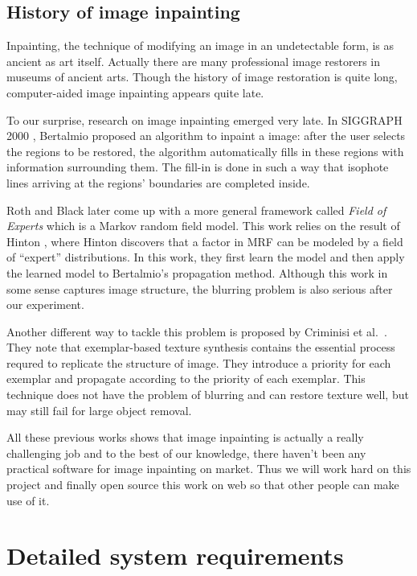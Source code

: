 \subsection{History of image inpainting}
Inpainting, the technique of modifying an image in an undetectable form, is as ancient as art itself. Actually there are many professional image restorers in museums of ancient arts. Though the history of image restoration is quite long, computer-aided image inpainting appears quite late.

To our surprise, research on image inpainting emerged very late. In SIGGRAPH 2000 \cite{siggraph00}, Bertalmio proposed an algorithm to inpaint a image: after the user selects the regions to be
restored, the algorithm automatically fills in these regions with information surrounding them. The fill-in is done in such a way that
isophote lines arriving at the regions’ boundaries are completed inside.

Roth and Black \cite{cvpr05} later come up with a more general framework 
called \emph{Field of Experts} which is a Markov random field model. This
work relies on the result of Hinton \cite{neco02}, where Hinton discovers
that a factor in MRF can be modeled by a field of ``expert'' distributions.
In this work, they first learn the model and then apply the learned model
to Bertalmio's propagation method. Although this work in some sense captures
image structure, the blurring problem is also serious after our experiment.

Another different way to tackle this problem is proposed by Criminisi et al.\ 
 \cite{cvpr03,tip04}. They note that exemplar-based texture synthesis
 contains the essential process requred to replicate the structure of image.
 They introduce a priority for each exemplar and propagate according to
 the priority of each exemplar. This technique does not have the problem
 of blurring and can restore texture well, but may still fail for large
 object removal.

All these previous works shows that image inpainting is actually a really challenging job and to the best of our knowledge, there haven't been any practical software for image inpainting on market. Thus we will work hard on this project and finally open source this work on web so that other people can make use of it.

\section{Detailed system requirements}
